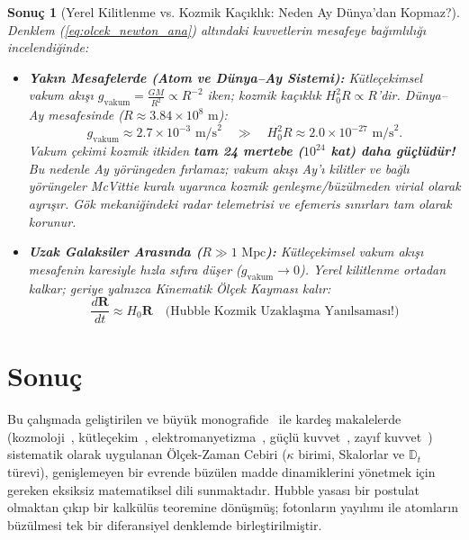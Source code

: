 \documentclass[11pt,a4paper]{article}
\newtheorem{corollary}{Sonuç}[theorem]
\begin{document}
\begin{corollary}[Yerel Kilitlenme vs. Kozmik Kaçıklık: Neden Ay Dünya'dan Kopmaz?]
    \label{cor:yerel_kilitlenme_kozmik_kaciklik_sc}
    Denklem (\ref{eq:olcek_newton_ana}) altındaki kuvvetlerin mesafeye bağımlılığı incelendiğinde:
    \begin{itemize}
        \item \textbf{Yakın Mesafelerde (Atom ve Dünya--Ay Sistemi):} Kütleçekimsel vakum akışı $g_{\mathrm{vakum}} = \frac{GM}{R^2} \propto R^{-2}$ iken; kozmik kaçıklık $H_0^2 R \propto R$'dir. Dünya--Ay mesafesinde ($R \approx 3.84 \times 10^8\text{ m}$):
              \begin{equation}
                  g_{\mathrm{vakum}} \approx 2.7 \times 10^{-3}\text{ m/s}^2 \quad \gg \quad H_0^2 R \approx 2.0 \times 10^{-27}\text{ m/s}^2.
              \end{equation}
              Vakum çekimi kozmik itkiden \textbf{tam 24 mertebe ($10^{24}$ kat) daha güçlüdür!} Bu nedenle Ay yörüngeden fırlamaz; vakum akışı Ay'ı kilitler ve bağlı yörüngeler McVittie kuralı uyarınca kozmik genleşme/büzülmeden virial olarak ayrışır. Gök mekaniğindeki radar telemetrisi ve efemeris sınırları tam olarak korunur.
        \item \textbf{Uzak Galaksiler Arasında ($R \gg 1\text{ Mpc}$):} Kütleçekimsel vakum akışı mesafenin karesiyle hızla sıfıra düşer ($g_{\mathrm{vakum}} \to 0$). Yerel kilitlenme ortadan kalkar; geriye yalnızca Kinematik Ölçek Kayması kalır:
              \begin{equation}
                  \frac{d\mathbf{R}}{dt} \approx H_0 \mathbf{R} \quad \text{(Hubble Kozmik Uzaklaşma Yanılsaması!)}
              \end{equation}
    \end{itemize}
\end{corollary}

\section{Sonuç}

\label{sec:sonuc}

Bu çalışmada geliştirilen ve büyük monografide~\cite{main_paper} ile kardeş makalelerde (kozmoloji~\cite{paper1}, kütleçekim~\cite{paper4}, elektromanyetizma~\cite{paper5}, güçlü kuvvet~\cite{paper6}, zayıf kuvvet~\cite{paper7}) sistematik olarak uygulanan Ölçek-Zaman Cebiri ($\kappa$ birimi, Skalorlar ve $\mathbb{D}_t$ türevi), genişlemeyen bir evrende büzülen madde dinamiklerini yönetmek için gereken eksiksiz matematiksel dili sunmaktadır. Hubble yasası bir postulat olmaktan çıkıp bir kalkülüs teoremine dönüşmüş; fotonların yayılımı ile atomların büzülmesi tek bir diferansiyel denklemde birleştirilmiştir.
\end{document}
